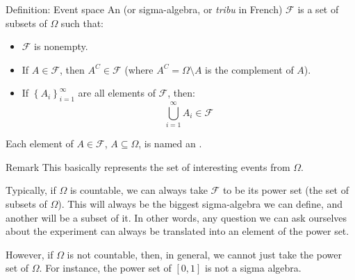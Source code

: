 \documentclass[a4paper]{article}
\begin{document}
\begin{parag}{Definition: Event space}
    An  (or sigma-algebra, or \textit{tribu} in French) $\mathcal{F}$ is a set of subsets of $\Omega$ such that:
    \begin{itemize}
        \item $\mathcal{F}$ is nonempty.
        \item If $A \in \mathcal{F}$, then $A^C \in \mathcal{F}$ (where $A^C = \Omega \setminus A$ is the complement of $A$).
        \item If $\left\{A_i\right\}_{i=1}^{\infty}$ are all elements of $\mathcal{F}$, then: 
        \[\bigcup_{i=1}^{\infty} A_i \in\mathcal{F}\]
    \end{itemize}

    Each element of $A \in \mathcal{F}$, $A \subseteq \Omega$, is named an .

    \begin{subparag}{Remark}
        This basically represents the set of interesting events from $\Omega$. 

        Typically, if $\Omega$ is countable, we can always take $\mathcal{F}$ to be its power set (the set of subsets of $\Omega$). This will always be the biggest sigma-algebra we can define, and another will be a subset of it. In other words, any question we can ask ourselves about the experiment can always be translated into an element of the power set.

        However, if $\Omega$ is not countable, then, in general, we cannot just take the power set of $\Omega$. For instance, the power set of $\left[0, 1\right]$ is not a sigma algebra. 
    \end{subparag}
\end{parag}
\end{document}
